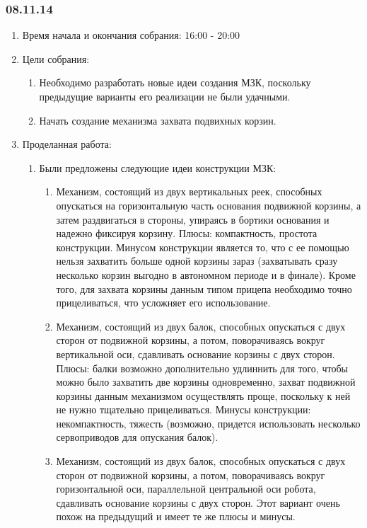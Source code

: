
\subsubsection{08.11.14}

\begin{enumerate}
	\item Время начала и окончания собрания:
	16:00 - 20:00
	\item Цели собрания:
	\begin{enumerate}
		\item Необходимо разработать новые идеи создания МЗК, поскольку предыдущие варианты его реализации не были удачными.
		
		\item Начать создание механизма захвата подвихных корзин.
		
	\end{enumerate}
	
	\item Проделанная работа:
	\begin{enumerate}
		\item Были предложены следующие идеи конструкции МЗК:
		\begin{enumerate}
			\item Механизм, состоящий из двух вертикальных реек, способных опускаться на горизонтальную часть основания подвижной корзины, а затем раздвигаться в стороны, упираясь в бортики основания и надежно фиксируя корзину. Плюсы: компактность, простота конструкции. Минусом конструкции является то, что с ее помощью нельзя захватить больше одной корзины зараз (захватывать сразу несколько корзин выгодно в автономном периоде и в финале). Кроме того, для захвата корзины данным типом прицепа необходимо точно прицеливаться, что усложняет его использование.
			
			\item Механизм, состоящий из двух балок, способных опускаться с двух сторон от подвижной корзины, а потом, поворачиваясь вокруг вертикальной оси, сдавливать основание корзины с двух сторон. Плюсы: балки возможно дополнительно удлиннить для того, чтобы можно было захватить две корзины одновременно, захват подвижной корзины данным механизмом осуществлять проще, поскольку к ней не нужно тщательно прицеливаться. Минусы конструкции: некомпактность, тяжесть (возможно, придется использовать несколько сервоприводов для опускания балок).
			
			\item Механизм, состоящий из двух балок, способных опускаться с двух сторон от подвижной корзины, а потом, поворачиваясь вокруг горизонтальной оси, параллельной центральной оси робота, сдавливать основание корзины с двух сторон. Этот вариант очень похож на предыдущий и имеет те же плюсы и минусы.
			

\end{enumerate}
\end{enumerate}
\end{enumerate}
